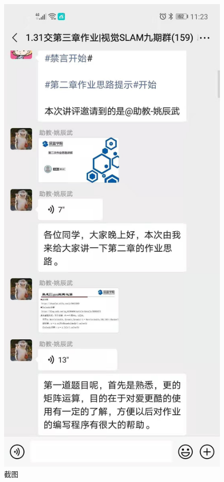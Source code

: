 \documentclass{article}
\begin{document}
\begin{figure}[h!]
\centering
\includegraphics[scale=0.1]{haha}
\caption{截图}
\label{fig:haha}
\end{figure}



\end{document}

